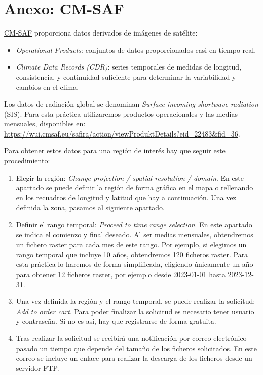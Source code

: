 \documentclass[11pt]{article}
\begin{document}
\clearpage

\section{Anexo: CM-SAF}
\label{sec:cmsaf}
\href{https://wui.cmsaf.eu/safira/action/viewProduktSearch}{CM-SAF}
proporciona datos derivados de imágenes de satélite:
\begin{itemize}
\item \emph{Operational Products}: conjuntos de datos proporcionados casi en
  tiempo real.

\item \emph{Climate Data Records (CDR)}: series temporales de medidas de
  longitud, consistencia, y continuidad suficiente para determinar la
  variabilidad y cambios en el clima.
\end{itemize}

Los datos de radiación global se denominan \emph{Surface incoming
  shortwave radiation} (SIS). Para esta práctica utilizaremos
productos operacionales y las medias mensuales, disponibles
en:
\url{https://wui.cmsaf.eu/safira/action/viewProduktDetails?eid=22483&fid=36}.

Para obtener estos datos para una región de interés hay que seguir
este procedimiento:
\begin{enumerate}
\item Elegir la región: \emph{Change projection / spatial resolution /
    domain}. En este apartado se puede definir la región de forma
  gráfica en el mapa o rellenando en los recuadros de longitud y
  latitud que hay a continuación. Una vez definida la zona, pasamos al
  siguiente apartado.
\item Definir el rango temporal: \emph{Proceed to time range
    selection}. En este apartado se indica el comienzo y final
  deseado. Al ser medias mensuales, obtendremos un fichero raster para
  cada mes de este rango. Por ejemplo, si elegimos un rango temporal
  que incluye 10 años, obtendremos 120 ficheros raster. Para esta
  práctica lo haremos de forma simplificada, eligiendo únicamente
  un año para obtener 12 ficheros raster, por ejemplo desde 2023-01-01
  hasta 2023-12-31.
\item Una vez definida la región y el rango temporal, se puede
  realizar la solicitud: \emph{Add to order cart}. Para poder
  finalizar la solicitud es necesario tener usuario y contraseña. Si
  no es así, hay que registrarse de forma gratuita.
\item Tras realizar la solicitud se recibirá una notificación por
  correo electrónico pasado un tiempo que depende del tamaño de los
  ficheros solicitados. En este correo se incluye un enlace para
  realizar la descarga de los ficheros desde un servidor FTP.
\end{enumerate}
\end{document}
